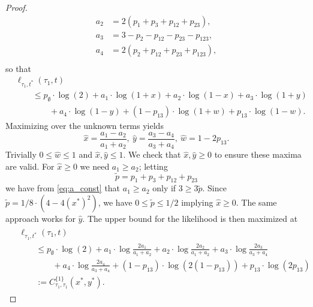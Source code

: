 \begin{proof}
\begin{equation}
\begin{aligned}
        a_{2} &= 2(p_{1}+p_{3}+p_{12}+p_{23}), \\
        a_{3} &= 3-p_{2}-p_{12}-p_{23}-p_{123}, \\
        a_{4} &= 2(p_{2}+p_{12}+p_{23}+p_{123}), \\
    \end{aligned}
    \label{eq:a_const}
\end{equation}
so that
\begin{equation*}
\begin{split}
&    \ell_{\tau_1,t^*}(\tau_1, t) \\
&\qquad \le      p_{\emptyset}  \cdot\log(2)
+ a_{1}\cdot\log(1+x)
+ a_{2}\cdot\log(1-x)
+ a_{3}\cdot\log(1+y) \\
&\qquad\qquad + a_{4}\cdot\log(1-y)
+ (1-p_{13})\cdot\log(1+w)
+ p_{13}\cdot\log(1-w).
\end{split}
\end{equation*}
Maximizing over the unknown terms yields
\[
\hat{x} = \frac{a_{1}-a_{2}}{a_{1}+a_{2}}, \ \hat{y} = \frac{a_{3}-a_{4}}{a_{3}+a_{4}}, \ \hat{w} = 1-2p_{13}.
\]
Trivially $0 \le \hat{w} \le 1$ and $\hat{x}, \hat{y} \le 1$.
We check that $\hat{x}, \hat{y} \ge 0$ to ensure these maxima are valid.
For $\hat{x} \ge 0$ we need $a_1 \ge a_2$; letting
\[
\tilde{p} = p_{1}+p_{3}+p_{12}+p_{23}
\]
we have from \eqref{eq:a_const} that $a_1 \ge a_2$ only if $3 \ge 3\tilde{p}$.
Since $\tilde{p} = 1/8\cdot(4-4(x^*)^2)$, we have $0 \le \tilde{p} \le 1/2$ implying $\hat{x} \ge 0$.
The same approach works for $\hat{y}$.
The upper bound for the likelihood is then maximized at
\begin{align}
\begin{split}
&    \ell_{\tau_1,t^*}(\tau_1, t) \\
&\qquad\le      p_{\emptyset}  \cdot\log(2)
+ a_{1}\cdot\log\frac{2a_{1}}{a_{1}+a_{2}}
+ a_{2}\cdot\log\frac{2a_{2}}{a_{1}+a_{2}}
+ a_{3}\cdot\log\frac{2a_{3}}{a_{3}+a_{4}} \\
&\qquad\qquad + a_{4}\cdot\log\frac{2a_{4}}{a_{3}+a_{4}}
+ (1-p_{13})\cdot\log(2(1-p_{13}))
+ p_{13}\cdot\log(2p_{13}) \\
&\qquad := C^{\{1\}}_{\tau_1,\tau_1}(x^*, y^*).
\end{split}
\label{eq:farris-upper-bound-1}
\end{align}


\end{proof}

